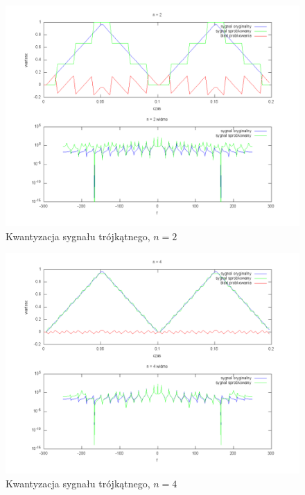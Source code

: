 \documentclass[wide,a4paper,titlepage,12pt]{mwart}
\begin{document}
	\begin{landscape}
	  \begin{figure}[htbp]
	    \begin{center}
	      \includegraphics[scale=.5]{out/kwant3-2.png}
	      \caption{\label{kwant3-2} Kwantyzacja sygnału trójkątnego, $n=2$}
	    \end{center}
	  \end{figure}
	\end{landscape}

	\begin{landscape}
	  \begin{figure}[htbp]
	    \begin{center}
	      \includegraphics[scale=.5]{out/kwant3-4.png}
	      \caption{\label{kwant3-4} Kwantyzacja sygnału trójkątnego, $n=4$}
	    \end{center}
	  \end{figure}
	\end{landscape}
\end{document}
